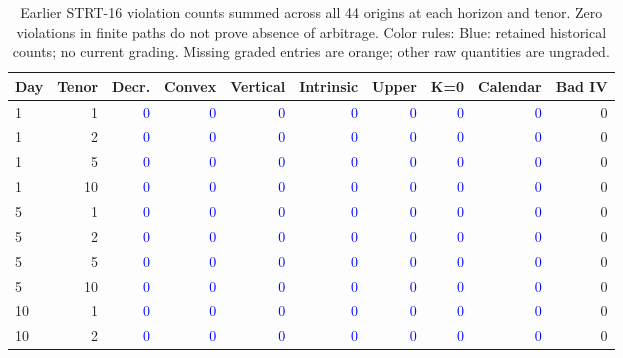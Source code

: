 \documentclass[11pt]{article}
\begin{document}
\begin{table}[H]\centering\small\setlength{\tabcolsep}{4pt}
\caption{Earlier STRT-16 violation counts summed across all 44 origins at each horizon and tenor. Zero violations in finite paths do not prove absence of arbitrage. Color rules: Blue: retained historical counts; no current grading. Missing graded entries are orange; other raw quantities are ungraded.}\label{tab:current-static}
\begin{tabular}{@{}lrrrrrrrrr@{}}
\toprule
Day & Tenor & Decr. & Convex & Vertical & Intrinsic & Upper & K=0 & Calendar & Bad IV \\
\midrule
1 & 1 & \textcolor{blue}{0} & \textcolor{blue}{0} & \textcolor{blue}{0} & \textcolor{blue}{0} & \textcolor{blue}{0} & \textcolor{blue}{0} & \textcolor{blue}{0} & 0 \\
1 & 2 & \textcolor{blue}{0} & \textcolor{blue}{0} & \textcolor{blue}{0} & \textcolor{blue}{0} & \textcolor{blue}{0} & \textcolor{blue}{0} & \textcolor{blue}{0} & 0 \\
1 & 5 & \textcolor{blue}{0} & \textcolor{blue}{0} & \textcolor{blue}{0} & \textcolor{blue}{0} & \textcolor{blue}{0} & \textcolor{blue}{0} & \textcolor{blue}{0} & 0 \\
1 & 10 & \textcolor{blue}{0} & \textcolor{blue}{0} & \textcolor{blue}{0} & \textcolor{blue}{0} & \textcolor{blue}{0} & \textcolor{blue}{0} & \textcolor{blue}{0} & 0 \\
5 & 1 & \textcolor{blue}{0} & \textcolor{blue}{0} & \textcolor{blue}{0} & \textcolor{blue}{0} & \textcolor{blue}{0} & \textcolor{blue}{0} & \textcolor{blue}{0} & 0 \\
5 & 2 & \textcolor{blue}{0} & \textcolor{blue}{0} & \textcolor{blue}{0} & \textcolor{blue}{0} & \textcolor{blue}{0} & \textcolor{blue}{0} & \textcolor{blue}{0} & 0 \\
5 & 5 & \textcolor{blue}{0} & \textcolor{blue}{0} & \textcolor{blue}{0} & \textcolor{blue}{0} & \textcolor{blue}{0} & \textcolor{blue}{0} & \textcolor{blue}{0} & 0 \\
5 & 10 & \textcolor{blue}{0} & \textcolor{blue}{0} & \textcolor{blue}{0} & \textcolor{blue}{0} & \textcolor{blue}{0} & \textcolor{blue}{0} & \textcolor{blue}{0} & 0 \\
10 & 1 & \textcolor{blue}{0} & \textcolor{blue}{0} & \textcolor{blue}{0} & \textcolor{blue}{0} & \textcolor{blue}{0} & \textcolor{blue}{0} & \textcolor{blue}{0} & 0 \\
10 & 2 & \textcolor{blue}{0} & \textcolor{blue}{0} & \textcolor{blue}{0} & \textcolor{blue}{0} & \textcolor{blue}{0} & \textcolor{blue}{0} & \textcolor{blue}{0} & 0 \\

\end{tabular}
\end{table}
\end{document}
